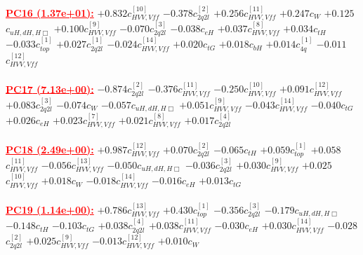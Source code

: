 \documentclass{article}
\begin{document}
\noindent \textcolor{red}{\underline{\bf{PC16} (1.37e+01):}}
{$+0.832$}{\rm $c_{HVV,Vff}^{[10]}$} 
{$-0.378$}{\rm $c_{2q2l}^{[2]}$} 
{$+0.256$}{\rm $c_{HVV,Vff}^{[11]}$} 
{$+0.247$}{\rm $c_{W}$} 
{$+0.125$}{\rm $c_{uH,dH,H\Box}$} 
{$+0.100$}{\rm $c_{HVV,Vff}^{[9]}$} 
{$-0.070$}{\rm $c_{2q2l}^{[3]}$} 
{$-0.038$}{\rm $c_{eH}$} 
{$+0.037$}{\rm $c_{HVV,Vff}^{[8]}$} 
{$+0.034$}{\rm $c_{tH}$} 
{$-0.033$}{\rm $c_{top}^{[1]}$} 
{$+0.027$}{\rm $c_{2q2l}^{[1]}$} 
{$-0.024$}{\rm $c_{HVV,Vff}^{[14]}$} 
{$+0.020$}{\rm $c_{tG}$} 
{$+0.018$}{\rm $c_{bH}$} 
{$+0.014$}{\rm $c_{4q}^{[1]}$} 
{$-0.011$}{\rm $c_{HVV,Vff}^{[12]}$} 
 \nonumber \\ \nonumber \\ 
\noindent \textcolor{red}{\underline{\bf{PC17} (7.13e+00):}}
{$-0.874$}{\rm $c_{2q2l}^{[2]}$} 
{$-0.376$}{\rm $c_{HVV,Vff}^{[11]}$} 
{$-0.250$}{\rm $c_{HVV,Vff}^{[10]}$} 
{$+0.091$}{\rm $c_{HVV,Vff}^{[12]}$} 
{$+0.083$}{\rm $c_{2q2l}^{[3]}$} 
{$-0.074$}{\rm $c_{W}$} 
{$-0.057$}{\rm $c_{uH,dH,H\Box}$} 
{$+0.051$}{\rm $c_{HVV,Vff}^{[9]}$} 
{$-0.043$}{\rm $c_{HVV,Vff}^{[14]}$} 
{$-0.040$}{\rm $c_{tG}$} 
{$+0.026$}{\rm $c_{eH}$} 
{$+0.023$}{\rm $c_{HVV,Vff}^{[7]}$} 
{$+0.021$}{\rm $c_{HVV,Vff}^{[8]}$} 
{$+0.017$}{\rm $c_{2q2l}^{[4]}$} 
 \nonumber \\ \nonumber \\ 
\noindent \textcolor{red}{\underline{\bf{PC18} (2.49e+00):}}
{$+0.987$}{\rm $c_{HVV,Vff}^{[12]}$} 
{$+0.070$}{\rm $c_{2q2l}^{[2]}$} 
{$-0.065$}{\rm $c_{tH}$} 
{$+0.059$}{\rm $c_{top}^{[1]}$} 
{$+0.058$}{\rm $c_{HVV,Vff}^{[11]}$} 
{$-0.056$}{\rm $c_{HVV,Vff}^{[13]}$} 
{$-0.050$}{\rm $c_{uH,dH,H\Box}$} 
{$-0.036$}{\rm $c_{2q2l}^{[3]}$} 
{$+0.030$}{\rm $c_{HVV,Vff}^{[9]}$} 
{$+0.025$}{\rm $c_{HVV,Vff}^{[10]}$} 
{$+0.018$}{\rm $c_{W}$} 
{$-0.018$}{\rm $c_{HVV,Vff}^{[14]}$} 
{$-0.016$}{\rm $c_{eH}$} 
{$+0.013$}{\rm $c_{tG}$} 
 \nonumber \\ \nonumber \\ 
\noindent \textcolor{red}{\underline{\bf{PC19} (1.14e+00):}}
{$+0.786$}{\rm $c_{HVV,Vff}^{[13]}$} 
{$+0.430$}{\rm $c_{top}^{[1]}$} 
{$-0.356$}{\rm $c_{2q2l}^{[3]}$} 
{$-0.179$}{\rm $c_{uH,dH,H\Box}$} 
{$-0.148$}{\rm $c_{tH}$} 
{$-0.103$}{\rm $c_{tG}$} 
{$+0.038$}{\rm $c_{2q2l}^{[4]}$} 
{$+0.038$}{\rm $c_{HVV,Vff}^{[11]}$} 
{$-0.030$}{\rm $c_{eH}$} 
{$+0.030$}{\rm $c_{HVV,Vff}^{[14]}$} 
{$-0.028$}{\rm $c_{2q2l}^{[2]}$} 
{$+0.025$}{\rm $c_{HVV,Vff}^{[9]}$} 
{$-0.013$}{\rm $c_{HVV,Vff}^{[12]}$} 
{$+0.010$}{\rm $c_{W}$} 
 \nonumber \\ \nonumber \\ 
\end{document}
